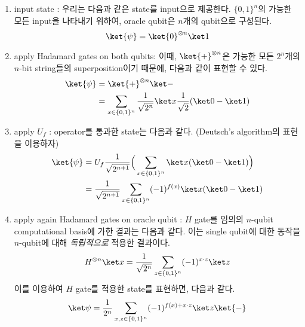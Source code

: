 \begin{enumerate}
  \item input state
  : 우리는 다음과 같은 state를 input으로 제공한다. $\{0, 1\}^n$의 가능한 모든 input을 나타내기 위하여, oracle qubit은 $n$개의 qubit으로 구성된다.
  \begin{equation*}
    \ket{\psi} = \ket{0}^{\otimes n} \ket 1
  \end{equation*}
  \item apply Hadamard gates on both qubits: 이때, $\ket{+}^{\otimes n}$은 가능한 모든 $2^n$개의 $n$-bit string들의 superposition이기 때문에, 다음과 같이 표현할 수 있다.
  \begin{align*}
    \ket{\psi} &= \ket{+}^{\otimes n} \ket - \\
              &= \sum_{x \in \{0, 1\}^n} \frac{1}{\sqrt{2^{n}}} \ket x  \frac{1}{\sqrt 2}(\ket 0 - \ket 1)
  \end{align*}
  \item apply $U_f$
  : operator를 통과한 state는 다음과 같다. (Deutsch’s algorithm의 표현을 이용하자)
  \begin{align*}
    \ket{\psi} &= U_f  \frac{1}{\sqrt{2^{n+1}}} \Big(\sum_{x \in \{0, 1\}^n} \ket x  (\ket 0 - \ket 1)\Big)\\
              &= \frac{1}{\sqrt{2^{n+1}}} \sum_{x \in \{0, 1\}^n} (-1)^{f(x)} \ket x  (\ket 0 - \ket 1)
  \end{align*}
  \item apply again Hadamard gates on oracle qubit
  : $H$ gate를 임의의 $n$-qubit computational basis에 가한 결과는 다음과 같다. 이는 single qubit에 대한 동작을 $n$-qubit에 대해 \textit{독립적으로} 적용한 결과이다.
  \begin{equation}
    H^{\otimes n} \ket x = \frac{1}{\sqrt{2^n}} \sum_{z \in \{0, 1\}^n} (-1)^{x \cdot z} \ket z 
  \end{equation}\label{eq:tensor-H}
  이를 이용하여 $H$ gate를 적용한 state를 표현하면, 다음과 같다.
  \begin{equation*}
    \ket \psi  = \frac{1}{{2^n}} \sum_{x, z \in \{0, 1\}^n} (-1)^{f(x) + x \cdot z} \ket z \ket{-}
  \end{equation*}
  

\end{enumerate}
